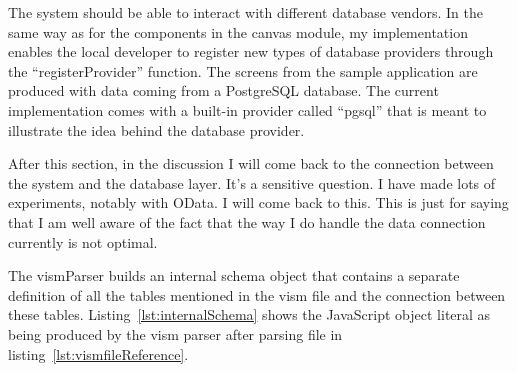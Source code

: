 The system should be able to interact with different database vendors. In the same way as for the components in the canvas module, my implementation enables the local developer to register new types of database providers through the ``registerProvider'' function. The screens from the sample application are produced with data coming from a PostgreSQL database. The current implementation comes with a built-in provider called ``pgsql'' that is meant to illustrate the idea behind the database provider.

After this section, in the discussion I will come back to the connection between the system and the database layer. It's a sensitive question. I have made lots of experiments, notably with OData. I will come back to this. This is just for saying that I am well aware of the fact that the way I do handle the data connection currently is not optimal.



The vismParser builds an internal schema object that contains a separate definition of all the tables mentioned in the vism file and the connection between these tables. Listing~\ref{lst:internalSchema} shows the JavaScript object literal as being produced by the vism parser after parsing file in listing~\ref{lst:vismfileReference}.